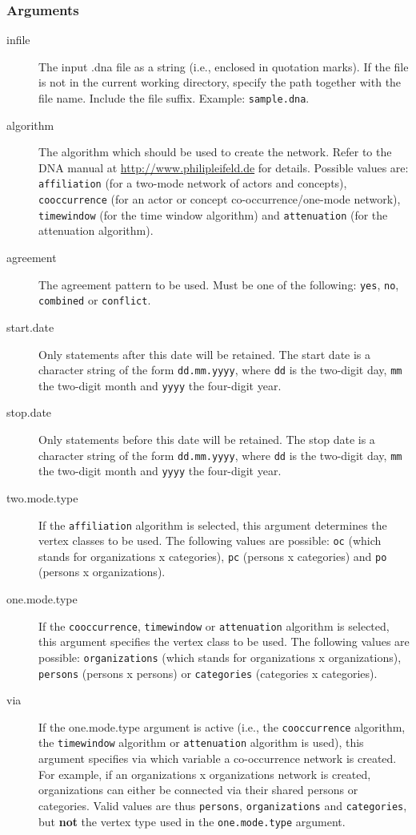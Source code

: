 \documentclass[a4paper, 10pt]{article}
\begin{document}
\subsubsection*{Arguments}
\begin{description}
  \item[infile]{ The input .dna file as a string (i.e., enclosed in quotation marks). If the file is not in the current working directory, specify the path together with the file name. Include the file suffix. Example: \texttt{sample.dna}. }
  \item[algorithm]{ The algorithm which should be used to create the network. Refer to the DNA manual at \url{http://www.philipleifeld.de} for details. Possible values are: \texttt{affiliation} (for a two-mode network of actors and concepts), \texttt{cooccurrence} (for an actor or concept co-occurrence/one-mode network), \texttt{timewindow} (for the time window algorithm) and \texttt{attenuation} (for the attenuation algorithm). }
  \item[agreement]{ The agreement pattern to be used. Must be one of the following: \texttt{yes}, \texttt{no}, \texttt{combined} or \texttt{conflict}. }
  \item[start.date]{ Only statements after this date will be retained. The start date is a character string of the form \texttt{dd.mm.yyyy}, where \texttt{dd} is the two-digit day, \texttt{mm} the two-digit month and \texttt{yyyy} the four-digit year.}
  \item[stop.date]{ Only statements before this date will be retained. The stop date is a character string of the form \texttt{dd.mm.yyyy}, where \texttt{dd} is the two-digit day, \texttt{mm} the two-digit month and \texttt{yyyy} the four-digit year.}
  \item[two.mode.type]{ If the \texttt{affiliation} algorithm is selected, this argument determines the vertex classes to be used. The following values are possible: \texttt{oc} (which stands for organizations x categories),  \texttt{pc} (persons x categories) and \texttt{po} (persons x organizations). }
  \item[one.mode.type]{ If the \texttt{cooccurrence}, \texttt{timewindow} or \texttt{attenuation} algorithm is selected, this argument specifies the vertex class to be used. The following values are possible: \texttt{organizations} (which stands for organizations x organizations), \texttt{persons} (persons x persons) or \texttt{categories} (categories x categories). }
  \item[via]{ If the one.mode.type argument is active (i.e., the \texttt{cooccurrence} algorithm, the \texttt{timewindow} algorithm or \texttt{attenuation} algorithm is used), this argument specifies via which variable a co-occurrence network is created. For example, if an organizations x organizations network is created, organizations can either be connected via their shared persons or categories. Valid values are thus \texttt{persons}, \texttt{organizations} and \texttt{categories}, but \textbf{not} the vertex type used in the \texttt{one.mode.type} argument. }

\end{description}
\end{document}
